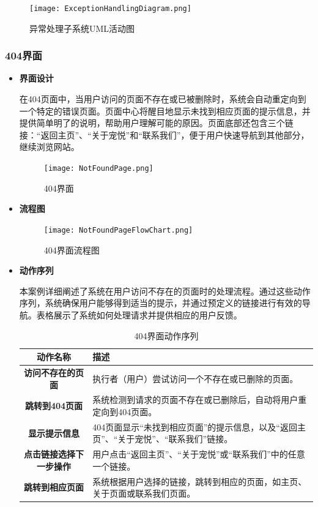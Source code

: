 \begin{figure}[H]
	\centering
	\texttt{[image: ExceptionHandlingDiagram.png]} 
	\caption{异常处理子系统UML活动图}
\end{figure}

\subsubsection{404界面}

\begin{itemize}
	
	\item \textbf{界面设计}
	
	在404页面中，当用户访问的页面不存在或已被删除时，系统会自动重定向到一个特定的错误页面。页面中心将醒目地显示未找到相应页面的提示信息，并提供简单明了的说明，帮助用户理解可能的原因。页面底部还包含三个链接：“返回主页”、“关于宠悦”和“联系我们”，便于用户快速导航到其他部分，继续浏览网站。
	
	\begin{figure}[H] 
		\centering
		\texttt{[image: NotFoundPage.png]} 
		\caption{404界面}
		\label{NotFoundPage}
	\end{figure}	
	
	\item \textbf{流程图}
	
	\begin{figure}[H]
		\centering
		\texttt{[image: NotFoundPageFlowChart.png]}
		\caption{404界面流程图}
		\label{fig:404}
	\end{figure}
	
	\item \textbf{动作序列}
	
	本案例详细阐述了系统在用户访问不存在的页面时的处理流程。通过这些动作序列，系统确保用户能够得到适当的提示，并通过预定义的链接进行有效的导航。表格展示了系统如何处理请求并提供相应的用户反馈。
	
	\begin{table}[H]
		\centering
		\caption{404界面动作序列}
		\renewcommand\arraystretch{1.5}
		\begin{tabular}{|c|>{\raggedright\arraybackslash}p{10cm}|}
			\hline
			\textbf{动作名称} & \textbf{描述} \\ \hline
			\textbf{访问不存在的页面} & 执行者（用户）尝试访问一个不存在或已删除的页面。 \\ \hline
			\textbf{跳转到404页面} & 系统检测到请求的页面不存在或已删除后，自动将用户重定向到404页面。 \\ \hline
			\textbf{显示提示信息} & 404页面显示“未找到相应页面”的提示信息，以及“返回主页”、“关于宠悦”、“联系我们”链接。 \\ \hline
			\textbf{点击链接选择下一步操作} & 用户点击“返回主页”、“关于宠悦”或“联系我们”中的任意一个链接。 \\ \hline
			\textbf{跳转到相应页面} & 系统根据用户选择的链接，跳转到相应的页面，如主页、关于页面或联系我们页面。 \\ \hline
		\end{tabular}
	\end{table}
	

\end{itemize}
